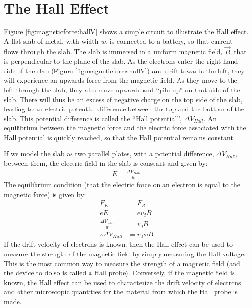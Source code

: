\section{The Hall Effect}
Figure \ref{fig:magneticforce:hallV} shows a simple circuit to illustrate the Hall effect. A flat slab of metal, with width $w$, is connected to a battery, so that current flows through the slab. The slab is immersed in a uniform magnetic field, $\vec B$, that is perpendicular to the plane of the slab.
As the electrons enter the right-hand side of the slab (Figure \ref{fig:magneticforce:hallV}) and drift towards the left, they will experience an upwards force from the magnetic field. As they move to the left through the slab, they also move upwards and ``pile up'' on that side of the slab. There will thus be an excess of negative charge on the top side of the slab, leading to an electric potential difference between the top and the bottom of the slab. This potential difference is called the ``Hall potential'', $\Delta V_{Hall}$. An equilibrium between the magnetic force and the electric force associated with the Hall potential is quickly reached, so that the Hall potential remains constant.

If we model the slab as two parallel plates, with a potential difference, $\Delta V_{Hall}$, between them, the electric field in the slab is constant and given by:
\begin{align*}
E= \frac{\Delta V_{Hall}}{w}
\end{align*}
The equilibrium condition (that the electric force on an electron is equal to the magnetic force) is given by:
\begin{align*}
F_E &= F_B\\
eE &= ev_dB\\
\frac{\Delta V_{Hall}}{w} &= v_d B\\
\therefore \Delta V_{Hall}&= v_d wB
\end{align*}
If the drift velocity of electrons is known, then the Hall effect can be used to measure the strength of the magnetic field by simply measuring the Hall voltage. This is the most common way to measure the strength of a magnetic field (and the device to do so is called a Hall probe). Conversely, if the magnetic field is known, the Hall effect can be used to characterize the drift velocity of electrons and other microscopic quantities for the material from which the Hall probe is made.

